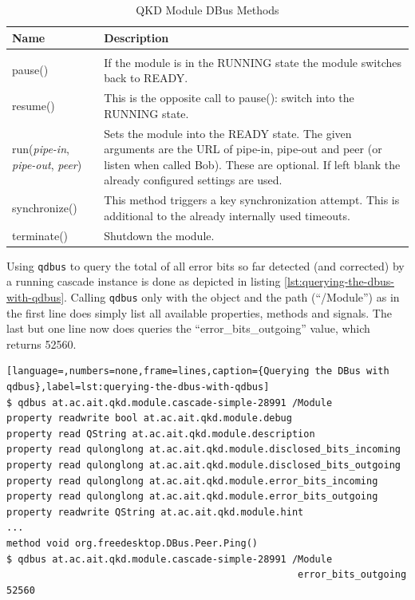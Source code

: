 \begin{table}[ht!]
    \begin{tabular}{lp{9cm}}
    Name                                                &   Description \\
    \hline
    \\
    pause()                                             &   If the module is in the RUNNING state the module switches back to READY.\\ [0.5em]
    resume()                                            &   This is the opposite call to pause(): switch into the RUNNING state.\\ [0.5em]
    run(\emph{pipe-in}, \emph{pipe-out}, \emph{peer})   &   Sets the module into the READY state. The given arguments are the URL of pipe-in, pipe-out and peer (or listen when called Bob). These are optional. If left blank the already configured settings are used.\\ [0.5em]
    synchronize()                                       &   This method triggers a key synchronization attempt. This is additional to the already internally used timeouts.\\ [0.5em]
    terminate()                                         &   Shutdown the module.\\ [0.5em]
    \end{tabular}
    \caption{QKD Module DBus Methods}
    \label{tab:QKD Module DBus Methods}
\end{table}

\medskip

Using \texttt{qdbus} to query the total of all error bits so far detected (and corrected) by a running cascade instance is done as depicted in listing \ref{lst:querying-the-dbus-with-qdbus}. Calling \texttt{qdbus} only with the object and the path (``/Module'') as in the first line does simply list all available properties, methods and signals. The last but one line now does queries the ``error\_bits\_outgoing'' value, which returns 52560.

\begin{lstlisting}[language=,numbers=none,frame=lines,caption={Querying the DBus with qdbus},label=lst:querying-the-dbus-with-qdbus]
$ qdbus at.ac.ait.qkd.module.cascade-simple-28991 /Module
property readwrite bool at.ac.ait.qkd.module.debug
property read QString at.ac.ait.qkd.module.description
property read qulonglong at.ac.ait.qkd.module.disclosed_bits_incoming
property read qulonglong at.ac.ait.qkd.module.disclosed_bits_outgoing
property read qulonglong at.ac.ait.qkd.module.error_bits_incoming
property read qulonglong at.ac.ait.qkd.module.error_bits_outgoing
property readwrite QString at.ac.ait.qkd.module.hint
...
method void org.freedesktop.DBus.Peer.Ping()
$ qdbus at.ac.ait.qkd.module.cascade-simple-28991 /Module 
                                                   error_bits_outgoing
52560
\end{lstlisting}

